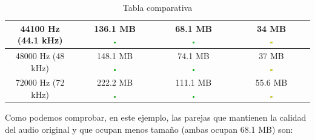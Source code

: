 \documentclass[11pt,a4paper]{article}
\begin{document}
\begin{table}[H]
\begin{tabular}{|c|c|c|c|}
44100 Hz (44.1 kHz) & \makecell{136.1 MB\\ \includegraphics[width=0.03\textwidth]{mb.png}} & \makecell{68.1 MB\\ \includegraphics[width=0.03\textwidth]{mb.png}} & \makecell{34 MB\\ \includegraphics[width=0.03\textwidth]{r.png}} \\ \hline

48000 Hz (48 kHz) & \makecell{148.1 MB\\ \includegraphics[width=0.03\textwidth]{mb.png}} & \makecell{74.1 MB\\ \includegraphics[width=0.03\textwidth]{mb.png}} & \makecell{37 MB\\ \includegraphics[width=0.03\textwidth]{r.png}} \\ \hline

72000 Hz (72 kHz) & \makecell{222.2 MB\\ \includegraphics[width=0.03\textwidth]{mb.png}} & \makecell{111.1 MB\\ \includegraphics[width=0.03\textwidth]{mb.png}} & \makecell{55.6 MB\\\includegraphics[width=0.03\textwidth]{r.png}} \\ \hline
\end{tabular}
\caption{Tabla comparativa}
\label{my-label}
\end{table}

Como podemos comprobar, en este ejemplo, las parejas que mantienen la calidad del audio original y que ocupan menos tamaño (ambas ocupan 68.1 MB) son:
\end{document}
